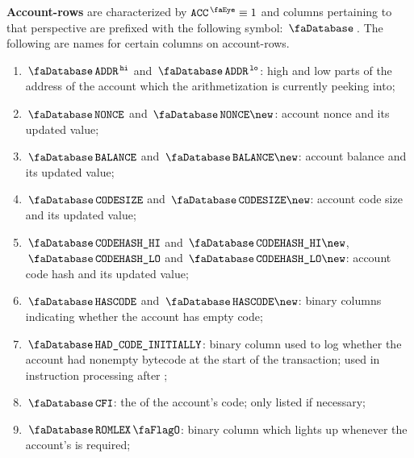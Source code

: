 \textbf{Account-rows} are characterized by $\peekAccount \equiv 1$ and columns pertaining to that perspective are prefixed with the following symbol: $\accountSignifier$. The following are names for certain columns on account-rows.
\begin{enumerate}
	\item $\accAddress\high$ and $\accAddress\low$:
		high and low parts of the address of the account which the arithmetization is currently peeking into;
	\item $\accNonce$ and $\accNonce\new$:
		account nonce and its updated value;
	\item $\accBalance$ and $\accBalance\new$:
		account balance and its updated value;
	\item $\accCodesize$ and $\accCodesize\new$:
		account code size and its updated value;
	\item $\accCodehashHi$ and $\accCodehashHi\new$, $\accCodehashLo$ and $\accCodehashLo\new$:
		account code hash and its updated value;
	\item $\accHasCode$ and $\accHasCode\new$:
		binary columns indicating whether the account has empty code;
	\item $\accHadCodeInitially$:
		binary column used to log whether the account had nonempty bytecode at the start of the transaction;
		used in  instruction processing after \cite{EIP-6780};
	\item $\accCfi$:
		the \CFI{} of the account's code; only listed if necessary;
	\item $\accRomLexFlag$:
		binary column which lights up whenever the account's \CFI{} is required;
\end{enumerate}


